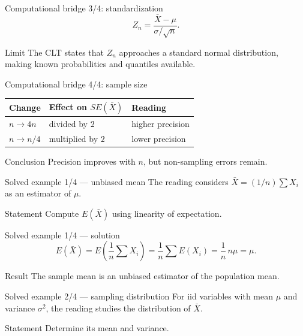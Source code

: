 \documentclass[10pt,aspectratio=169]{beamer}
\begin{document}
\begin{frame}{Computational bridge 3/4: standardization}
  \footnotesize
  \[
    Z_n=\frac{\bar X-\mu}{\sigma/\sqrt n}.
  \]
  \begin{alertblock}{Limit}
    The CLT states that $Z_n$ approaches a standard normal distribution, making
    known probabilities and quantiles available.
  \end{alertblock}
\end{frame}

\begin{frame}{Computational bridge 4/4: sample size}
  \footnotesize
  \begin{tabular}{lll}
    \hline
    Change & Effect on $SE(\bar X)$ & Reading \\
    \hline
    $n\to4n$ & divided by $2$ & higher precision \\
    $n\to n/4$ & multiplied by $2$ & lower precision \\
    \hline
  \end{tabular}
  \begin{block}{Conclusion}
    Precision improves with $n$, but non-sampling errors remain.
  \end{block}
\end{frame}

\begin{frame}{Solved example 1/4 --- unbiased mean}
  \footnotesize
  The reading considers $\bar X=(1/n)\sum X_i$ as an estimator of $\mu$.
  \begin{block}{Statement}
    Compute $E(\bar X)$ using linearity of expectation.
  \end{block}
\end{frame}

\begin{frame}{Solved example 1/4 --- solution}
  \footnotesize
  \[
    E(\bar X)=E\!\left(\frac1n\sum X_i\right)
    =\frac1n\sum E(X_i)=\frac1n\,n\mu=\mu.
  \]
  \begin{alertblock}{Result}
    The sample mean is an unbiased estimator of the population mean.
  \end{alertblock}
\end{frame}

\begin{frame}{Solved example 2/4 --- sampling distribution}
  \footnotesize
  For iid variables with mean $\mu$ and variance $\sigma^2$, the reading studies
  the distribution of $\bar X$.
  \begin{block}{Statement}
    Determine its mean and variance.
  \end{block}
\end{frame}
\end{document}
